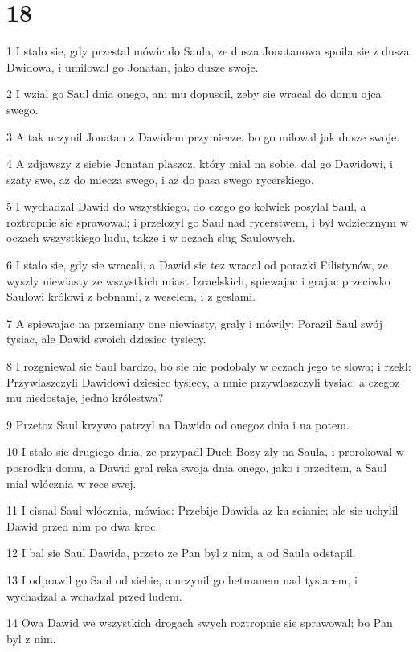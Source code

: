 \chapter{18}

\par 1 I stalo sie, gdy przestal mówic do Saula, ze dusza Jonatanowa spoila sie z dusza Dwidowa, i umilowal go Jonatan, jako dusze swoje.
\par 2 I wzial go Saul dnia onego, ani mu dopuscil, zeby sie wracal do domu ojca swego.
\par 3 A tak uczynil Jonatan z Dawidem przymierze, bo go milowal jak dusze swoje.
\par 4 A zdjawszy z siebie Jonatan plaszcz, który mial na sobie, dal go Dawidowi, i szaty swe, az do miecza swego, i az do pasa swego rycerskiego.
\par 5 I wychadzal Dawid do wszystkiego, do czego go kolwiek posylal Saul, a roztropnie sie sprawowal; i przelozyl go Saul nad rycerstwem, i byl wdziecznym w oczach wszystkiego ludu, takze i w oczach slug Saulowych.
\par 6 I stalo sie, gdy sie wracali, a Dawid sie tez wracal od porazki Filistynów, ze wyszly niewiasty ze wszystkich miast Izraelskich, spiewajac i grajac przeciwko Saulowi królowi z bebnami, z weselem, i z geslami.
\par 7 A spiewajac na przemiany one niewiasty, graly i mówily: Porazil Saul swój tysiac, ale Dawid swoich dziesiec tysiecy.
\par 8 I rozgniewal sie Saul bardzo, bo sie nie podobaly w oczach jego te slowa; i rzekl: Przywlaszczyli Dawidowi dziesiec tysiecy, a mnie przywlaszczyli tysiac: a czegoz mu niedostaje, jedno królestwa?
\par 9 Przetoz Saul krzywo patrzyl na Dawida od onegoz dnia i na potem.
\par 10 I stalo sie drugiego dnia, ze przypadl Duch Bozy zly na Saula, i prorokowal w posrodku domu, a Dawid gral reka swoja dnia onego, jako i przedtem, a Saul mial wlócznia w rece swej.
\par 11 I cisnal Saul wlócznia, mówiac: Przebije Dawida az ku scianie; ale sie uchylil Dawid przed nim po dwa kroc.
\par 12 I bal sie Saul Dawida, przeto ze Pan byl z nim, a od Saula odstapil.
\par 13 I odprawil go Saul od siebie, a uczynil go hetmanem nad tysiacem, i wychadzal a wchadzal przed ludem.
\par 14 Owa Dawid we wszystkich drogach swych roztropnie sie sprawowal; bo Pan byl z nim.
